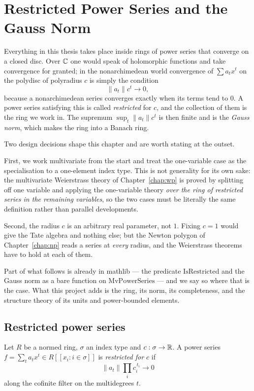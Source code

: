 \chapter{Restricted Power Series and the Gauss Norm}
\label{chap:rps}

Everything in this thesis takes place inside rings of power series that converge on a closed
disc.  Over $\mathbb{C}$ one would speak of holomorphic functions and take convergence for granted;
in the nonarchimedean world convergence of $\sum a_t x^t$ on the polydisc of polyradius $c$ is
simply the condition
\[
  \lVert a_t \rVert c^t \longrightarrow 0,
\]
because a nonarchimedean series converges exactly when its terms tend to $0$.  A power series
satisfying this is called \emph{restricted} for $c$, and the collection of them is the ring we
work in.  The supremum $\sup_t \lVert a_t\rVert c^t$ is then finite and is the \emph{Gauss
norm}, which makes the ring into a Banach ring.

Two design decisions shape this chapter and are worth stating at the outset.

First, we work multivariate from the start and treat the one-variable case as the specialisation
to a one-element index type.  This is not generality for its own sake: the multivariate
Weierstrass theory of Chapter~\ref{chap:wp} is proved by splitting off one variable and applying
the one-variable theory \emph{over the ring of restricted series in the remaining variables}, so
the two cases must be literally the same definition rather than parallel developments.

Second, the radius $c$ is an arbitrary real parameter, not $1$.  Fixing $c = 1$ would give the
Tate algebra and nothing else; but the Newton polygon of Chapter~\ref{chap:np} reads a series at
\emph{every} radius, and the Weierstrass theorems have to hold at each of them.

Part of what follows is already in mathlib --- the predicate $\mathrm{IsRestricted}$ and the
Gauss norm as a bare function on $\mathrm{MvPowerSeries}$ --- and we say so where that is the
case.  What this project adds is the ring, its norm, its completeness, and the structure theory
of its units and power-bounded elements.

\section{Restricted power series}

\begin{definition}
  \label{def:isrestricted}
  \leanok
  Let $R$ be a normed ring, $\sigma$ an index type and $c : \sigma \to \mathbb{R}$.  A power series
  $f = \sum_t a_t x^t \in R[[x_i : i \in \sigma]]$ is \emph{restricted for $c$} if
  \[
    \lVert a_t \rVert \prod_{i} c_i^{\,t_i} \longrightarrow 0
  \]
  along the cofinite filter on the multidegrees $t$.
\end{definition}

